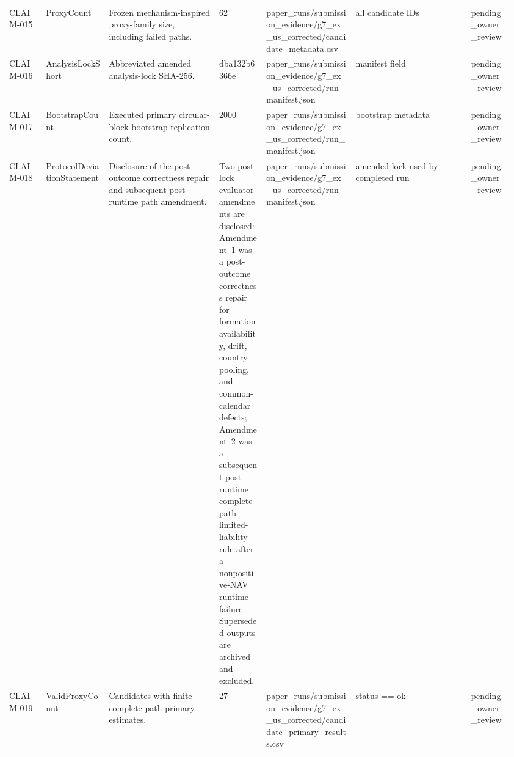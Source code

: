\begin{longtable}{@{}L{0.07\linewidth}L{0.12\linewidth}L{0.21\linewidth}L{0.09\linewidth}L{0.17\linewidth}L{0.22\linewidth}L{0.08\linewidth}@{}}
CLAIM-\allowbreak{}015 & ProxyCount & Frozen mechanism-inspired proxy-family size, including failed paths. & 62 & paper\_\allowbreak{}runs/\allowbreak{}submission\_\allowbreak{}evidence/\allowbreak{}g7\_\allowbreak{}ex\_\allowbreak{}us\_\allowbreak{}corrected/\allowbreak{}candidate\_\allowbreak{}metadata.\allowbreak{}csv & all candidate IDs & pending\_\allowbreak{}owner\_\allowbreak{}review \\
CLAIM-\allowbreak{}016 & AnalysisLock\allowbreak{}Short & Abbreviated amended analysis-lock SHA-256. & dba132b6366e & paper\_\allowbreak{}runs/\allowbreak{}submission\_\allowbreak{}evidence/\allowbreak{}g7\_\allowbreak{}ex\_\allowbreak{}us\_\allowbreak{}corrected/\allowbreak{}run\_\allowbreak{}manifest.\allowbreak{}json & manifest field & pending\_\allowbreak{}owner\_\allowbreak{}review \\
CLAIM-\allowbreak{}017 & BootstrapCou\allowbreak{}nt & Executed primary circular-block bootstrap replication count. & 2000 & paper\_\allowbreak{}runs/\allowbreak{}submission\_\allowbreak{}evidence/\allowbreak{}g7\_\allowbreak{}ex\_\allowbreak{}us\_\allowbreak{}corrected/\allowbreak{}run\_\allowbreak{}manifest.\allowbreak{}json & bootstrap metadata & pending\_\allowbreak{}owner\_\allowbreak{}review \\
CLAIM-\allowbreak{}018 & ProtocolDevi\allowbreak{}ationStateme\allowbreak{}nt & Disclosure of the post-outcome correctness repair and subsequent post-runtime path amendment. & Two post-lock evaluator amendments are disclosed: Amendment~1 was a post-outcome correctness repair for formation availability, drift, country pooling, and common-calendar defects; Amendment~2 was a subsequent post-runtime complete-path limited-liability rule after a nonpositive-NAV runtime failure. Superseded outputs are archived and excluded. & paper\_\allowbreak{}runs/\allowbreak{}submission\_\allowbreak{}evidence/\allowbreak{}g7\_\allowbreak{}ex\_\allowbreak{}us\_\allowbreak{}corrected/\allowbreak{}run\_\allowbreak{}manifest.\allowbreak{}json & amended lock used by completed run & pending\_\allowbreak{}owner\_\allowbreak{}review \\
CLAIM-\allowbreak{}019 & ValidProxyCo\allowbreak{}unt & Candidates with finite complete-path primary estimates. & 27 & paper\_\allowbreak{}runs/\allowbreak{}submission\_\allowbreak{}evidence/\allowbreak{}g7\_\allowbreak{}ex\_\allowbreak{}us\_\allowbreak{}corrected/\allowbreak{}candidate\_\allowbreak{}primary\_\allowbreak{}results.\allowbreak{}csv & status =\allowbreak{}=\allowbreak{} ok & pending\_\allowbreak{}owner\_\allowbreak{}review \\

\end{longtable}
